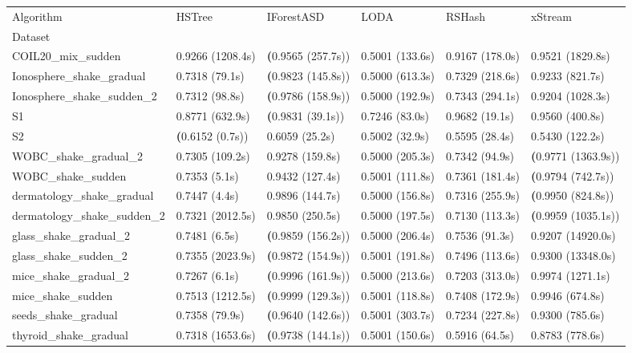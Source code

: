 \begin{tabular}{llllll}
\toprule
Algorithm & HSTree & IForestASD & LODA & RSHash & xStream \\
Dataset &  &  &  &  &  \\
\midrule
COIL20\_mix\_sudden & 0.9266 (1208.4s) & \textbf(0.9565 (257.7s)) & 0.5001 (133.6s) & 0.9167 (178.0s) & 0.9521 (1829.8s) \\
Ionosphere\_shake\_gradual & 0.7318 (79.1s) & \textbf(0.9823 (145.8s)) & 0.5000 (613.3s) & 0.7329 (218.6s) & 0.9233 (821.7s) \\
Ionosphere\_shake\_sudden\_2 & 0.7312 (98.8s) & \textbf(0.9786 (158.9s)) & 0.5000 (192.9s) & 0.7343 (294.1s) & 0.9204 (1028.3s) \\
S1 & 0.8771 (632.9s) & \textbf(0.9831 (39.1s)) & 0.7246 (83.0s) & 0.9682 (19.1s) & 0.9560 (400.8s) \\
S2 & \textbf(0.6152 (0.7s)) & 0.6059 (25.2s) & 0.5002 (32.9s) & 0.5595 (28.4s) & 0.5430 (122.2s) \\
WOBC\_shake\_gradual\_2 & 0.7305 (109.2s) & 0.9278 (159.8s) & 0.5000 (205.3s) & 0.7342 (94.9s) & \textbf(0.9771 (1363.9s)) \\
WOBC\_shake\_sudden & 0.7353 (5.1s) & 0.9432 (127.4s) & 0.5001 (111.8s) & 0.7361 (181.4s) & \textbf(0.9794 (742.7s)) \\
dermatology\_shake\_gradual & 0.7447 (4.4s) & 0.9896 (144.7s) & 0.5000 (156.8s) & 0.7316 (255.9s) & \textbf(0.9950 (824.8s)) \\
dermatology\_shake\_sudden\_2 & 0.7321 (2012.5s) & 0.9850 (250.5s) & 0.5000 (197.5s) & 0.7130 (113.3s) & \textbf(0.9959 (1035.1s)) \\
glass\_shake\_gradual\_2 & 0.7481 (6.5s) & \textbf(0.9859 (156.2s)) & 0.5000 (206.4s) & 0.7536 (91.3s) & 0.9207 (14920.0s) \\
glass\_shake\_sudden\_2 & 0.7355 (2023.9s) & \textbf(0.9872 (154.9s)) & 0.5001 (191.8s) & 0.7496 (113.6s) & 0.9300 (13348.0s) \\
mice\_shake\_gradual\_2 & 0.7267 (6.1s) & \textbf(0.9996 (161.9s)) & 0.5000 (213.6s) & 0.7203 (313.0s) & 0.9974 (1271.1s) \\
mice\_shake\_sudden & 0.7513 (1212.5s) & \textbf(0.9999 (129.3s)) & 0.5001 (118.8s) & 0.7408 (172.9s) & 0.9946 (674.8s) \\
seeds\_shake\_gradual & 0.7358 (79.9s) & \textbf(0.9640 (142.6s)) & 0.5001 (303.7s) & 0.7234 (227.8s) & 0.9300 (785.6s) \\
thyroid\_shake\_gradual & 0.7318 (1653.6s) & \textbf(0.9738 (144.1s)) & 0.5001 (150.6s) & 0.5916 (64.5s) & 0.8783 (778.6s) \\

\end{tabular}
